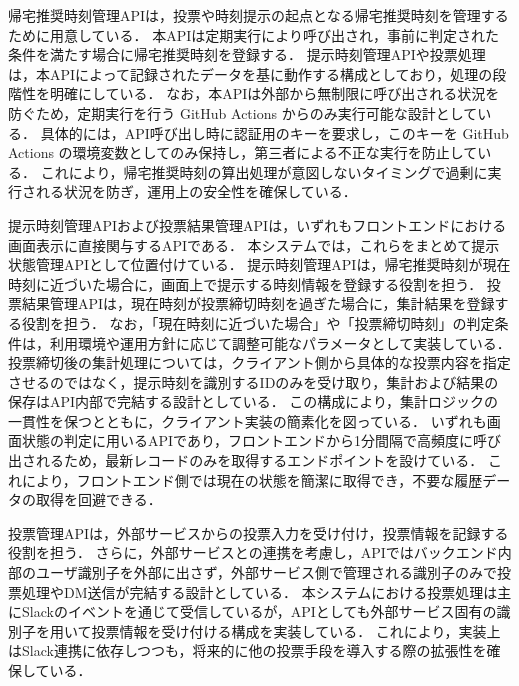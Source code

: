 帰宅推奨時刻管理APIは，投票や時刻提示の起点となる帰宅推奨時刻を管理するために用意している．
本APIは定期実行により呼び出され，事前に判定された条件を満たす場合に帰宅推奨時刻を登録する．
提示時刻管理APIや投票処理は，本APIによって記録されたデータを基に動作する構成としており，処理の段階性を明確にしている．
なお，本APIは外部から無制限に呼び出される状況を防ぐため，定期実行を行う GitHub Actions からのみ実行可能な設計としている．
具体的には，API呼び出し時に認証用のキーを要求し，このキーを GitHub Actions の環境変数としてのみ保持し，第三者による不正な実行を防止している．
これにより，帰宅推奨時刻の算出処理が意図しないタイミングで過剰に実行される状況を防ぎ，運用上の安全性を確保している．


提示時刻管理APIおよび投票結果管理APIは，いずれもフロントエンドにおける画面表示に直接関与するAPIである．
本システムでは，これらをまとめて提示状態管理APIとして位置付けている．
提示時刻管理APIは，帰宅推奨時刻が現在時刻に近づいた場合に，画面上で提示する時刻情報を登録する役割を担う．
投票結果管理APIは，現在時刻が投票締切時刻を過ぎた場合に，集計結果を登録する役割を担う．
なお，「現在時刻に近づいた場合」や「投票締切時刻」の判定条件は，利用環境や運用方針に応じて調整可能なパラメータとして実装している．
投票締切後の集計処理については，クライアント側から具体的な投票内容を指定させるのではなく，提示時刻を識別するIDのみを受け取り，集計および結果の保存はAPI内部で完結する設計としている．
この構成により，集計ロジックの一貫性を保つとともに，クライアント実装の簡素化を図っている．
いずれも画面状態の判定に用いるAPIであり，フロントエンドから1分間隔で高頻度に呼び出されるため，最新レコードのみを取得するエンドポイントを設けている．
これにより，フロントエンド側では現在の状態を簡潔に取得でき，不要な履歴データの取得を回避できる．


投票管理APIは，外部サービスからの投票入力を受け付け，投票情報を記録する役割を担う．
さらに，外部サービスとの連携を考慮し，APIではバックエンド内部のユーザ識別子を外部に出さず，外部サービス側で管理される識別子のみで投票処理やDM送信が完結する設計としている．
本システムにおける投票処理は主にSlackのイベントを通じて受信しているが，APIとしても外部サービス固有の識別子を用いて投票情報を受け付ける構成を実装している．
これにより，実装上はSlack連携に依存しつつも，将来的に他の投票手段を導入する際の拡張性を確保している．
